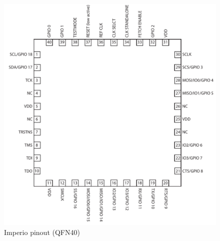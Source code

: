 \begin{figure}[htbp]
  \centering \includegraphics[width=\textwidth]{./figures/pinout_imperio}
  \caption{Imperio pinout (QFN40)}
\end{figure}

